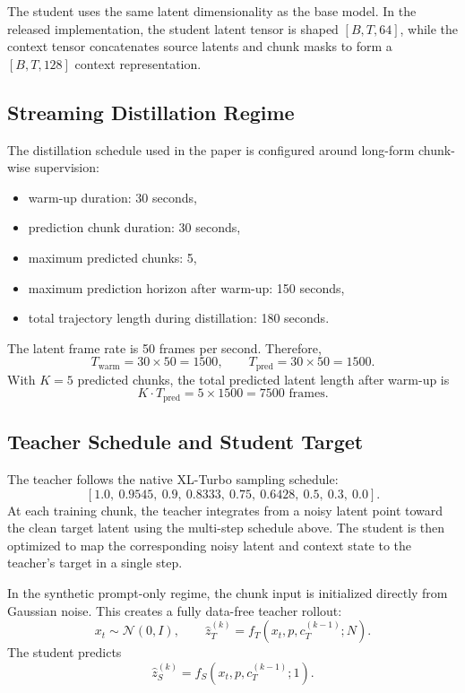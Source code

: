 \documentclass[11pt]{article}
\begin{document}
The student uses the same latent dimensionality as the base model. In the released implementation, the student latent tensor is shaped \([B, T, 64]\), while the context tensor concatenates source latents and chunk masks to form a \([B, T, 128]\) context representation.

\subsection{Streaming Distillation Regime}

The distillation schedule used in the paper is configured around long-form chunk-wise supervision:
\begin{itemize}
    \item warm-up duration: 30 seconds,
    \item prediction chunk duration: 30 seconds,
    \item maximum predicted chunks: 5,
    \item maximum prediction horizon after warm-up: 150 seconds,
    \item total trajectory length during distillation: 180 seconds.
\end{itemize}

The latent frame rate is 50 frames per second. Therefore,
\[
T_{\mathrm{warm}} = 30 \times 50 = 1500,\qquad
T_{\mathrm{pred}} = 30 \times 50 = 1500.
\]
With \(K=5\) predicted chunks, the total predicted latent length after warm-up is
\[
K \cdot T_{\mathrm{pred}} = 5 \times 1500 = 7500 \text{ frames}.
\]

\subsection{Teacher Schedule and Student Target}

The teacher follows the native XL-Turbo sampling schedule:
\[
[1.0,\ 0.9545,\ 0.9,\ 0.8333,\ 0.75,\ 0.6428,\ 0.5,\ 0.3,\ 0.0].
\]
At each training chunk, the teacher integrates from a noisy latent point toward the clean target latent using the multi-step schedule above. The student is then optimized to map the corresponding noisy latent and context state to the teacher's target in a single step.

In the synthetic prompt-only regime, the chunk input is initialized directly from Gaussian noise. This creates a fully data-free teacher rollout:
\[
x_t \sim \mathcal{N}(0, I),\qquad
\hat{z}_T^{(k)} = f_T(x_t, p, c_T^{(k-1)}; N).
\]
The student predicts
\[
\hat{z}_S^{(k)} = f_S(x_t, p, c_T^{(k-1)}; 1).
\]
\end{document}
